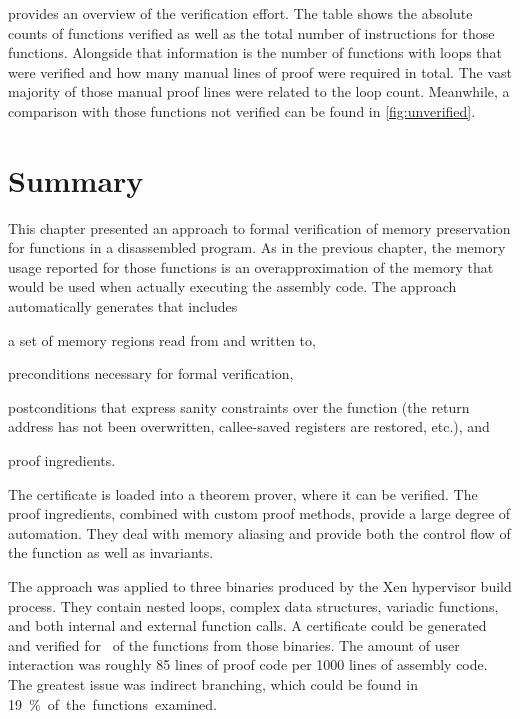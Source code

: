  provides an overview of the verification effort.
The table shows the absolute counts of functions verified
as well as the total number of instructions for those functions.
Alongside that information is the number of functions with loops
that were verified and how many manual lines of proof were required in total.
The vast majority of those manual proof lines were related to the loop count.
Meanwhile, a comparison with those functions not verified
can be found in \cref{fig:unverified}.

\section{Summary}
This chapter presented an approach to formal verification of memory preservation
for functions in a disassembled program. As in the previous chapter,
the memory usage reported for those functions is an overapproximation
of the memory that would be used when actually executing the assembly code.
The approach automatically generates  that includes
\begin{enumerate*}
  \item a set of memory regions read from and written to,
  \item preconditions necessary for formal verification,
  \item postconditions that express sanity constraints over the function
  (the return address has not been overwritten,
  callee-saved registers are restored, etc.), and
  \item proof ingredients.
\end{enumerate*}
The certificate is loaded into a theorem prover, where it can be verified.
The proof ingredients, combined with custom proof methods,
provide a large degree of automation.
They deal with memory aliasing and provide both the control flow of the function
as well as invariants.

The approach was applied to three binaries produced by the Xen hypervisor build process.
They contain nested loops, complex data structures, variadic functions,
and both internal and external function calls.
A certificate could be generated and verified
for \xenpercentage\ of the functions from those binaries.
The amount of user interaction was roughly 85 lines of proof code
per \num{1000} lines of assembly code.
The greatest issue was indirect branching,
which could be found in \SI{19}\percent of the functions examined.
